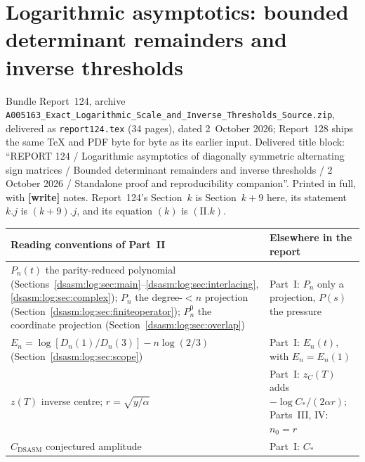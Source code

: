 \documentclass[11pt,letterpaper]{article}
\theoremstyle{remark}\newtheorem{remark}[theorem]{Remark}
\newcommand{\DS}{\mathrm{DSASM}}\newcommand{\ASM}{\mathrm{ASM}}
\newcommand{\file}[1]{\nolinkurl{#1}}
\newcommand{\partsource}[1]{\par\noindent\begin{minipage}{\textwidth}\small #1\end{minipage}\par\medskip}
\newcommand{\parteqs}[1]{\setcounter{equation}{0}%
 \renewcommand{\theequation}{#1\arabic{equation}}%
 \renewcommand{\theHequation}{#1\arabic{equation}}}
\begin{document}
\part{Logarithmic asymptotics: bounded determinant remainders and inverse thresholds}\label{dsasm:log:part}
\parteqs{II.}
\partsource{Bundle Report~124, archive \file{A005163_Exact_Logarithmic_Scale_and_Inverse_Thresholds_Source.zip}, delivered as \file{report124.tex} (34 pages), dated 2~October 2026; Report~128 ships the same TeX and PDF byte for byte as its earlier input. Delivered title block: ``REPORT 124 / Logarithmic asymptotics of diagonally symmetric alternating sign matrices / Bounded determinant remainders and inverse thresholds / 2 October 2026 / Standalone proof and reproducibility companion''. Printed in full, with \textbf{[write]} notes. Report~124's Section~$k$ is Section~$k+9$ here, its statement $k.j$ is $(k+9).j$, and its equation $(k)$ is $(\mathrm{II}.k)$.}
\begin{center}
\small
\begin{tabular}{@{}>{\raggedright\arraybackslash}p{} >{\raggedright\arraybackslash}p{}@{}}
\toprule
Reading conventions of Part~II & Elsewhere in the report\\
\midrule
$P_n(t)$ the parity-reduced polynomial (Sections~\ref{dsasm:log:sec:main}--\ref{dsasm:log:sec:interlacing}, \ref{dsasm:log:sec:complex}); $P_n$ the degree-$<n$ projection (Section~\ref{dsasm:log:sec:finiteoperator}); $P_n^0$ the coordinate projection (Section~\ref{dsasm:log:sec:overlap}) & Part~I: $P_n$ only a projection, $P(s)$ the pressure\\
$E_n=\log[D_n(1)/D_n(3)]-n\log(2/3)$ (Section~\ref{dsasm:log:sec:scope}) & Part~I: $E_n(t)$, with $E_n=E_n(1)$\\
$z(T)$ inverse centre; $r=\sqrt{y/\alpha}$ & Part~I: $z_C(T)$ adds $-\log C_*/(2\alpha r)$; Parts~III, IV: $n_0=r$\\
$C_{\DS}$ conjectured amplitude & Part~I: $C_*$\\
\bottomrule
\end{tabular}
\end{center}
\end{document}
